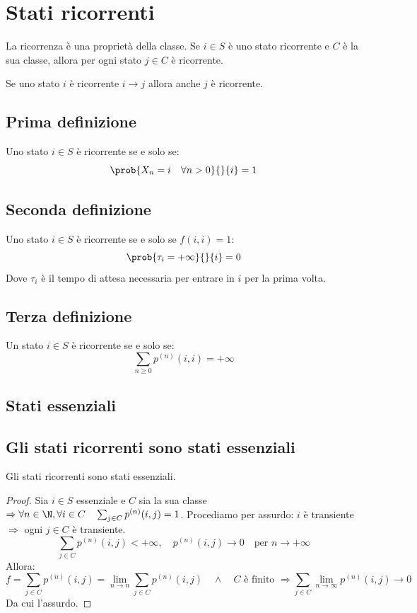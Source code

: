 \documentclass[\main/main.tex]{subfiles}
\begin{document}
\section{Stati ricorrenti}
La ricorrenza è una proprietà della classe. Se \(i \in S\) è uno stato ricorrente e \(C\) è la sua classe, allora per ogni stato \(j \in C\) è ricorrente.

Se uno stato \(i\) è ricorrente \(i \rightarrow j\) allora anche \(j\) è ricorrente.

\subsection{Prima definizione}
\begin{definition}
  Uno stato \(i \in S\) è ricorrente se e solo se:
  \[
    \prob{X_n = i \quad \forall n > 0}{}{i} = 1
  \]
\end{definition}
\subsection{Seconda definizione}
\begin{definition}
  Uno stato \(i \in S\) è ricorrente se e solo se \(f(i,i) = 1\):
  \[
    \prob{\tau_i = +\infty}{}{i} = 0
  \]
  Dove \(\tau_i\) è il tempo di attesa necessaria per entrare in \(i\) per la prima volta.
\end{definition}
\subsection{Terza definizione}
\begin{definition}
  Un stato \(i \in S \) è ricorrente se e solo se:
  \[
    \sum_{n\geq 0} p^{(n)}(i,i) = + \infty
  \]
\end{definition}
\subsection{Stati essenziali}
\subsection{Gli stati ricorrenti sono stati essenziali}
\begin{theorem}[Stati ricorrenti = stati essenziali]
  Gli stati ricorrenti sono stati essenziali.
\end{theorem}
\begin{proof}
  Sia \(i \in S\) essenziale e \(C\) sia la sua classe \(\Rightarrow \forall n \in \N, \forall i \in C \quad \sum_{j \in C} p^{(n)}(i,j) = 1\). Procediamo per assurdo: \(i\) è transiente \(\Rightarrow \) ogni \(j \in C\) è transiente.
  \[
    \sum_{j \in C} p^{(n)}(i,j) < + \infty,\quad p^{(n)}(i,j) \rightarrow 0 \quad \text{per } n \rightarrow + \infty
  \]
  Allora:
  \[
    f = \sum_{j \in C} p^{(n)}(i,j) = \lim_{n \rightarrow n} \sum_{j \in C} p^{(n)}(i,j) \quad \land \quad C \text{ è finito }\Rightarrow \sum_{j \in C} \lim_{n\rightarrow \infty} p^{(n)} (i,j) \rightarrow 0
  \]
  Da cui l'assurdo.
\end{proof}
\end{document}
